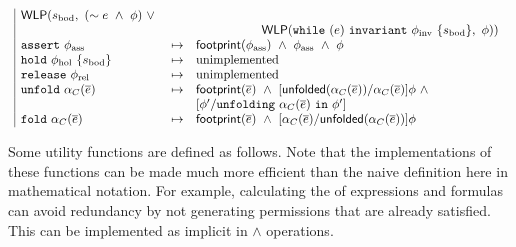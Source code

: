 \begin{spacing}{1.5}
\begin{align*}
\begin{array}{l}
\begin{array}{|lcl}
  \WLP(s_\text{bod}, \
    (\pnot e \ \land \ \phi) \ \lor \ \\ && \hspace{5.3em}
    \WLP(\code{while} \ (e) \ \code{invariant} \ \phi_\text{inv} \ \{ s_\text{bod} \}, \ \phi)
  )
\\
\code{assert} \ \phi_\text{ass} &\mapsto&
  \tsf{footprint}(\phi_\text{ass}) \ \land \
  \phi_\text{ass} \ \land \
  \phi
\\
\code{hold} \ \phi_\text{hol} \ \{ s_\text{bod} \} &\mapsto&
  \text{unimplemented} %
\\
\code{release} \ \phi_\text{rel} &\mapsto&
  \text{unimplemented} %
\\
\code{unfold} \ \alpha_C(\overline{e}) &\mapsto&
  \tsf{footprint}(\overline{e}) \ \land \
  [ \tsf{unfolded}(\alpha_C(\overline{e})) / \alpha_C(\overline{e}) ] \phi \ \land \\ &&
  [ \phi\p / \code{unfolding} \ \alpha_C(\overline{e}) \ \code{in} \ \phi\p ]
\\
\code{fold} \ \alpha_C(\overline{e}) &\mapsto&
  \tsf{footprint}(\overline{e}) \ \land \
  [ \alpha_C(\overline{e}) / \tsf{unfolded}(\alpha_C(\overline{e})) ] \phi
%
\end{array}
\end{array}
\end{align*}
\end{spacing}

\newpage
\noindent
Some utility functions are defined as follows. Note that the implementations of these functions can be made much more efficient than the naive definition here in mathematical notation. For example, calculating the  of expressions and formulas can avoid redundancy by not generating permissions that are already satisfied. This can be implemented as implicit in $\land$ operations.

